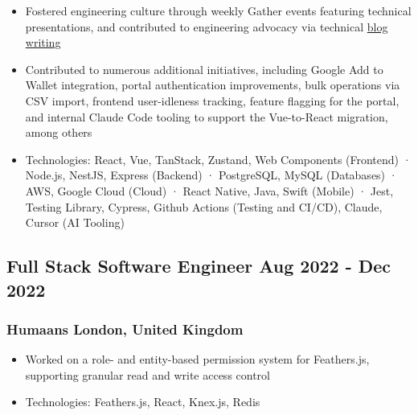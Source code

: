 \documentclass[11pt]{article} %
\begin{document}
\begin{itemize}
	\item Fostered engineering culture through weekly Gather events featuring technical presentations, and contributed to engineering advocacy via technical \href{https://medium.com/crowdedbanking/predicting-user-behavior-correcting-user-inputs-with-levenshtein-distance-f2a3e707e844}{blog writing}
	\item Contributed to numerous additional initiatives, including Google Add to Wallet integration, portal authentication improvements, bulk operations via CSV import, frontend user-idleness tracking, feature flagging for the portal, and internal Claude Code tooling to support the Vue-to-React migration, among others
	\item Technologies: React, Vue, TanStack, Zustand, Web Components (Frontend) · Node.js, NestJS, Express (Backend) · PostgreSQL, MySQL (Databases) · AWS, Google Cloud (Cloud) · React Native, Java, Swift (Mobile) · Jest, Testing Library, Cypress, Github Actions (Testing and CI/CD), Claude, Cursor (AI Tooling)
\end{itemize}

\subsection{Full Stack Software Engineer \hfill Aug 2022 - Dec 2022}
\subsubsection{Humaans \hfill London, United Kingdom}
\begin{itemize}
	\item Worked on a role- and entity-based permission system for Feathers.js, supporting granular read and write access control
	\item Technologies: Feathers.js, React, Knex.js, Redis
\end{itemize}
\end{document}
